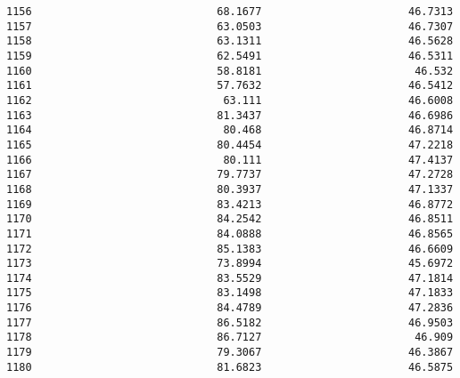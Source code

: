 \documentclass[11pt]{article}
\begin{document}
\begin{tcolorbox}[breakable, size=fbox, boxrule=.5pt, pad at break*=1mm, opacityfill=0]
\begin{Verbatim}[commandchars=\\\{\}]
1156                             68.1677                       46.7313
1157                             63.0503                       46.7307
1158                             63.1311                       46.5628
1159                             62.5491                       46.5311
1160                             58.8181                        46.532
1161                             57.7632                       46.5412
1162                              63.111                       46.6008
1163                             81.3437                       46.6986
1164                              80.468                       46.8714
1165                             80.4454                       47.2218
1166                              80.111                       47.4137
1167                             79.7737                       47.2728
1168                             80.3937                       47.1337
1169                             83.4213                       46.8772
1170                             84.2542                       46.8511
1171                             84.0888                       46.8565
1172                             85.1383                       46.6609
1173                             73.8994                       45.6972
1174                             83.5529                       47.1814
1175                             83.1498                       47.1833
1176                             84.4789                       47.2836
1177                             86.5182                       46.9503
1178                             86.7127                        46.909
1179                             79.3067                       46.3867
1180                             81.6823                       46.5875


\end{Verbatim}
\end{tcolorbox}
\end{document}
